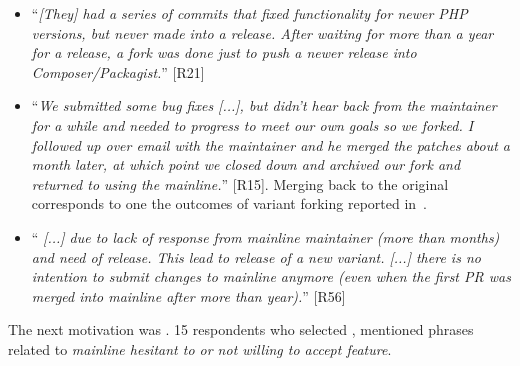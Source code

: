 \begin{itemize}[leftmargin=*]
\item ``\emph{[They] %
had a series of commits that fixed functionality for newer PHP versions, but never made into a release. %
After waiting for more than a year for a release, a fork was done just to push a newer release into Composer/Packagist.}'' [R21]

\item ``\emph{We submitted some bug fixes [...], %
but didn't hear back from the maintainer for a while and needed to progress to meet our own goals so we forked. I followed up over email with the maintainer and he merged the patches about a month later, at which point we closed down and archived our fork and returned to using the mainline.}'' [R15].
Merging back to the original corresponds to one the outcomes of variant forking reported in~\cite{Gregorio:2012}.

\item ``\emph{%
[...] due to lack of response from mainline maintainer (more than months) and need of release. This lead to release of a new variant. [...] there is no intention to submit changes to mainline anymore (even when the first PR was merged into mainline after more than year).}'' [R56]
\end{itemize}

\nd The next  motivation was .
15 respondents who selected , mentioned phrases related to \emph{mainline hesitant to or not willing to accept feature}.

